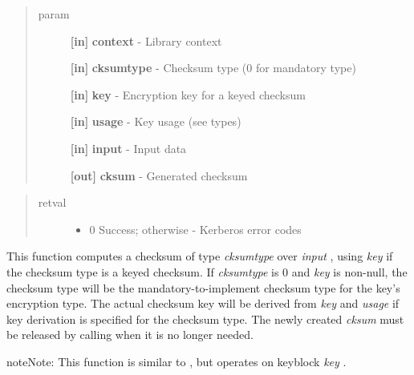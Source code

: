 \documentclass[letterpaper,10pt,english]{sphinxmanual}
\begin{document}
\begin{quote}\begin{description}
\item[{param}] \leavevmode
\textbf{{[}in{]}} \textbf{context} - Library context

\textbf{{[}in{]}} \textbf{cksumtype} - Checksum type (0 for mandatory type)

\textbf{{[}in{]}} \textbf{key} - Encryption key for a keyed checksum

\textbf{{[}in{]}} \textbf{usage} - Key usage (see  types)

\textbf{{[}in{]}} \textbf{input} - Input data

\textbf{{[}out{]}} \textbf{cksum} - Generated checksum

\end{description}\end{quote}
\begin{quote}\begin{description}
\item[{retval}] \leavevmode\begin{itemize}
\item {} 
0   Success; otherwise - Kerberos error codes

\end{itemize}

\end{description}\end{quote}

This function computes a checksum of type \emph{cksumtype} over \emph{input} , using \emph{key} if the checksum type is a keyed checksum. If \emph{cksumtype} is 0 and \emph{key} is non-null, the checksum type will be the mandatory-to-implement checksum type for the key's encryption type. The actual checksum key will be derived from \emph{key} and \emph{usage} if key derivation is specified for the checksum type. The newly created \emph{cksum} must be released by calling {\hyperref[appdev/refs/api/krb5_free_checksum_contents:c.krb5_free_checksum_contents]{}} when it is no longer needed.




{\hyperref[appdev/refs/api/krb5_c_verify_checksum:c.krb5_c_verify_checksum]{}}



\begin{notice}{note}{Note:}
This function is similar to {\hyperref[appdev/refs/api/krb5_k_make_checksum:c.krb5_k_make_checksum]{}} , but operates on keyblock \emph{key} .
\end{notice}
\end{document}
